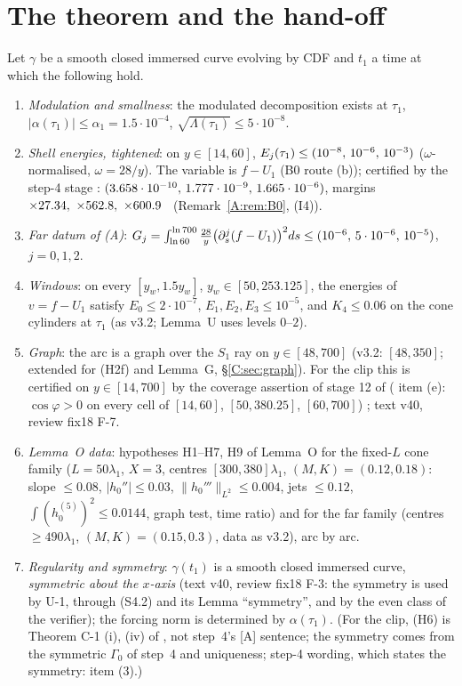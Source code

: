 \documentclass[11pt]{article}
\begin{document}
\section{The theorem and the hand-off}\label{M:sec:thm}
\begin{theorem}\label{M:thm:W}
Let $\gamma$ be a smooth closed immersed curve evolving by CDF and $t_1$ a time at which the following hold.
\begin{enumerate}[label=\textup{(H\arabic*)},leftmargin=*]
\item \emph{Modulation and smallness}: the modulated decomposition exists at $\tau_1$, $|\alpha(\tau_1)|\le\alpha_1=1.5\cdot10^{-4}$, $\sqrt{\Lambda(\tau_1)}\le5\cdot10^{-8}$.
\item \emph{Shell energies, tightened}: on $y\in[14,60]$, $E_j(\tau_1)\le(10^{-8},\,10^{-6},\,10^{-3})$ ($\omega$-normalised, $\omega=28/y$).
The variable is $f-U_1$ (B0 route (b)); certified by the step-4 stage : $(3.658\cdot10^{-10},\,1.777\cdot10^{-9},\,1.665\cdot10^{-6})$, margins $\times27.34,\ \times562.8,\ \times600.9$ \tC\ (Remark~\ref{A:rem:B0}, (I4)).
\item[\textup{(H2f)}] \emph{Far datum of (A)}: $G_j=\int_{\ln60}^{\ln700}\frac{28}y\bigl(\partial_s^j(f-U_1)\bigr)^2ds\le(10^{-6},\,5\cdot10^{-6},\,10^{-5})$, $j=0,1,2$.
\item[\textup{(H3)}] \emph{Windows}: on every $[y_w,1.5y_w]$, $y_w\in[50,253.125]$, the energies of $v=f-U_1$ satisfy $E_0\le2\cdot10^{-7}$, $E_1,E_2,E_3\le10^{-5}$, and $K_4\le0.06$ on the cone cylinders at $\tau_1$ (as v3.2; Lemma~U uses levels $0$--$2$).
\item[\textup{(H4)}] \emph{Graph}: the arc is a graph over the $S_1$ ray on $y\in[48,700]$ (v3.2: $[48,350]$; extended for (H2f) and Lemma~G, \S\ref{C:sec:graph}). For the clip this is certified on $y\in[14,700]$ by the coverage assertion of stage 12 of  ( item (e): $\cos\varphi>0$ on every cell of $[14,60]$, $[50,380.25]$, $[60,700]$) \tC; text v40, review fix18 F-7.
\item[\textup{(H5)}] \emph{Lemma~O data}: hypotheses H1--H7, H9 of Lemma~O for the fixed-$L$ cone family ($L=50\lambda_1$, $X=3$, centres $[300,380]\lambda_1$, $(M,K)=(0.12,0.18)$: slope $\le0.08$, $|h_0''|\le0.03$, $\|h_0'''\|_{L^2}\le0.004$, jets $\le0.12$, $\int(h_0^{(5)})^2\le0.0144$, graph test, time ratio) and for the far family (centres $\ge490\lambda_1$, $(M,K)=(0.15,0.3)$, data as v3.2), arc by arc.
\item[\textup{(H6)}] \emph{Regularity and symmetry}: $\gamma(t_1)$ is a smooth closed immersed curve, \emph{symmetric about the $x$-axis} (text v40, review fix18 F-3: the symmetry is used by U-1, through (S4.2) and its Lemma ``symmetry'', and by the even class of the verifier); the forcing norm is determined by $\alpha(\tau_1)$. (For the clip, (H6) is Theorem C-1 (i), (iv) of , not step~4's [A] sentence; the symmetry comes from the symmetric $\Gamma_0$ of step~4 and uniqueness; step-4 wording, which states the symmetry:  item (3).)

\end{enumerate}
\end{theorem}
\end{document}
